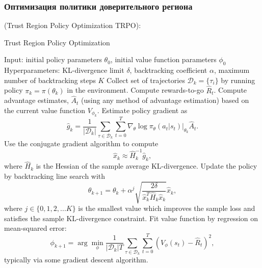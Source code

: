 \documentclass[a4paper,12pt]{article}
\begin{document}
\subsubsection{Оптимизация политики доверительного региона}
(Trust Region Policy Optimization TRPO):
\begin{algorithm}[H]
    \caption{Trust Region Policy Optimization}
    \label{alg1}
\begin{algorithmic}[1]
    \STATE Input: initial policy parameters $\theta_0$, initial value function parameters $\phi_0$
    \STATE Hyperparameters: KL-divergence limit $\delta$, backtracking coefficient $\alpha$, maximum number of backtracking steps $K$
    \STATE Collect set of trajectories ${\mathcal D}_k = \{\tau_i\}$ by running policy $\pi_k = \pi(\theta_k)$ in the environment.
    \STATE Compute rewards-to-go $\hat{R}_t$.
    \STATE Compute advantage estimates, $\hat{A}_t$ (using any method of advantage estimation) based on the current value function $V_{\phi_k}$.
    \STATE Estimate policy gradient as
        \begin{equation*}
        \hat{g}_k = \frac{1}{|{\mathcal D}_k|} \sum_{\tau \in {\mathcal D}_k} \sum_{t=0}^T \left. \nabla_{\theta} \log\pi_{\theta}(a_t|s_t)\right|_{\theta_k} \hat{A}_t.
        \end{equation*}
    \STATE Use the conjugate gradient algorithm to compute
        \begin{equation*}
        \hat{x}_k \approx \hat{H}_k^{-1} \hat{g}_k,
        \end{equation*}
        where $\hat{H}_k$ is the Hessian of the sample average KL-divergence.
    \STATE Update the policy by backtracking line search with
        \begin{equation*}
        \theta_{k+1} = \theta_k + \alpha^j \sqrt{ \frac{2\delta}{\hat{x}_k^T \hat{H}_k \hat{x}_k}} \hat{x}_k,
        \end{equation*}
        where $j \in \{0, 1, 2, ... K\}$ is the smallest value which improves the sample loss and satisfies the sample KL-divergence constraint.
    \STATE Fit value function by regression on mean-squared error:
        \begin{equation*}
        \phi_{k+1} = \arg \min_{\phi} \frac{1}{|{\mathcal D}_k| T} \sum_{\tau \in {\mathcal D}_k} \sum_{t=0}^T\left( V_{\phi} (s_t) - \hat{R}_t \right)^2,
        \end{equation*}
        typically via some gradient descent algorithm.
    \ENDFOR
\end{algorithmic}
\end{algorithm}
\end{document}
